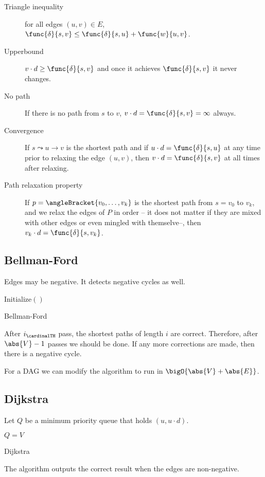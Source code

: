 \begin{description}
    \item[Triangle inequality] for all edges \((u,v) \in E\), \(\func{\delta}{s,v} \leq \func{\delta}{s,u} + \func{w}{u,v}\). 
    \item[Upperbound] \(v\cdot d \geq \func{\delta}{s,v}\) and once it achieves \(\func{\delta}{s,v}\) it never changes.
    \item[No path] If there is no path from \(s\) to \(v\), \(v \cdot d = \func{\delta}{s,v} = \infty\)  always. 
    \item[Convergence] If \(s \leadsto u \to v\) is the shortest path and if \(u\cdot d = \func{\delta}{s,u}\) at any time prior to relaxing the edge \((u,v)\), then \(v \cdot d = \func{\delta}{s,v}\) at all times after relaxing.
    \item[Path relaxation property] If \(p = \angleBracket{v_0, \dots, v_k}\) is the shortest path from \(s = v_0\) to \(v_k\), and we relax the edges of \(P\) in order -- it does not matter if they are mixed with other edges or even mingled with themselve--, then \(v_k \cdot d = \func{\delta}{s,v_k}\).
    \item[]  
\end{description}
\subsection*{Bellman-Ford}
Edges may be negative. It detects negative cycles as well. 

\begin{algorithm}
    \DontPrintSemicolon
    Initialize\(()\)\;
    \caption{Bellman-Ford}
\end{algorithm}
After \(i_{\cardinalTH}\) pass, the shortest paths of length \(i\) are correct. Therefore, after \(\abs{V} - 1\) passes we should be done. If any more corrections are made, then there is a negative cycle. 

For a DAG we can modify the algorithm to run in \(\bigO{\abs{V} + \abs{E}}\).
\subsection*{Dijkstra}
Let \(Q\) be a minimum priority queue that holds \((u,u \cdot d)\).
\begin{algorithm}
    \DontPrintSemicolon
    \(Q = V\)\;
    \caption{Dijkstra}
\end{algorithm}
The algorithm outputs the correct result when the edges are non-negative.
